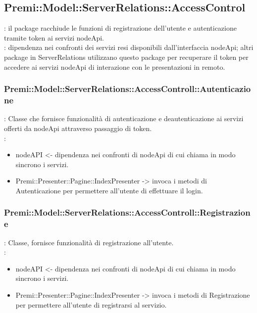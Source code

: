 \subsection{Premi::Model::ServerRelations::AccessControl}{
		\textbf{\tipo}: il package racchiude le funzioni di registrazione dell’utente e autenticazione tramite token ai servizi nodeApi.\\
		\textbf{\relaz}: dipendenza nei confronti dei servizi resi disponibili dall’interfaccia nodeApi; altri package in ServerRelations utilizzano questo package per recuperare il token per accedere ai servizi nodeApi di interazione con le presentazioni in remoto.\\
        \subsubsection{Premi::Model::ServerRelations::AccessControll::Autenticazione}{
				\textbf{\tipo}: Classe che fornisce funzionalità di autenticazione e deautenticazione ai servizi offerti da nodeApi attraverso passaggio di token.\\	
				\textbf{\relaz}: 
				\begin{itemize}
					\item nodeAPI <- dipendenza nei confronti di nodeApi di cui chiama in modo sincrono i servizi.
                    \item Premi::Presenter::Pagine::IndexPresenter -> invoca i metodi di Autenticazione per permettere all'utente di effettuare il login.
				\end{itemize}	
                    }
        \subsubsection{Premi::Model::ServerRelations::AccessControll::Registrazione}{
				\textbf{\tipo}: Classe, fornisce funzionalità di registrazione all’utente.\\	
				\textbf{\relaz}: 
				\begin{itemize}
					\item nodeAPI <- dipendenza nei confronti di nodeApi di cui chiama in modo sincrono i servizi.
                    \item Premi::Presenter::Pagine::IndexPresenter -> invoca i metodi di Registrazione per permettere all'utente di registrarsi al servizio.
				\end{itemize}	
            }
}

